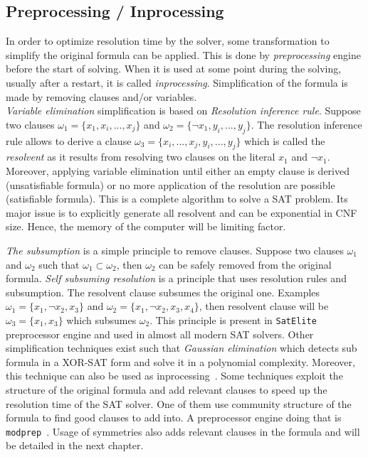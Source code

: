 \subsection{Preprocessing / Inprocessing}
In order to optimize resolution time by the solver, some transformation to simplify the original formula can be applied.
This is done by \emph{preprocessing} engine before the start of solving.
When it is used at some point during the solving, usually after a restart, it is called \emph{inprocessing}.
Simplification of the formula is made by removing clauses and/or variables.\\
\emph{Variable elimination} simplification is based on \emph{Resolution inference rule}.
Suppose two clauses $\omega_1 = \{x_1, x_i, ..., x_j \}$ and $\omega_2 = \{\neg x_1, y_i, ..., y_j\}$.
The resolution inference rule allows to derive a clause $\omega_3 = \{x_i, ..., x_j, y_i, ..., y_j\}$ which is called
the \emph{resolvent} as it results from resolving two clauses on the literal $x_1$ and $\neg x_1$.
Moreover,  applying variable elimination until either an empty clause is derived (unsatisfiable formula) or no more application of the resolution are possible (satisfiable formula). This is a complete algorithm to solve a SAT problem.
Its major issue is to explicitly generate all resolvent and can be exponential in CNF size.
Hence, the memory of the computer will be limiting factor.

\emph{The subsumption} is a simple principle to remove clauses. Suppose two clauses $\omega_1$ and $\omega_2$ such that
$\omega_1 \subset  \omega_2$, then $\omega_2$ can be safely removed from the original formula.
\emph{Self subsuming resolution} is a principle that uses resolution rules and subsumption.
The resolvent clause subsumes the original one. Examples $\omega_1 = \{x_1, \neg x_2, x_3\}$ and $\omega_2 = \{x_1, \neg x_2, x_3, x_4\}$, then resolvent clause will be $\omega_3 = \{x_1, x_3\}$ which subsumes $\omega_2$. This principle
is present in \texttt{SatElite}~\cite{een2005effective} preprocessor engine and used in almost all modern SAT solvers.
Other simplification techniques exist such that \emph{Gaussian elimination} which detects sub formula in a XOR-SAT
form and solve it in a polynomial complexity. Moreover, this technique can also be used as inprocessing~\cite{soos2010enhanced}. 
Some techniques exploit the structure of the original formula and add relevant clauses to speed up the resolution
time of the SAT solver. One of them use community structure of the formula to find good clauses to add into.
A preprocessor engine doing that is  \texttt{modprep}~\cite{ansotegui2015using}.
Usage of symmetries also adds relevant clauses in the formula and will be detailed in the next chapter.


